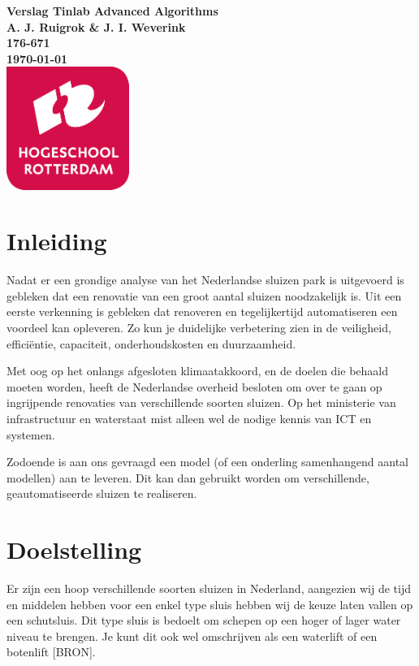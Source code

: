 \documentclass{article}
\begin{document}
\graphicspath{{../Images/}}
\sffamily
\begin{titlepage}
  \centering
    \vfill
    {\bfseries\Huge
      Verslag Tinlab Advanced Algorithms \\
        \vskip2cm
      }
      {\bfseries\Large
        A. J. Ruigrok \& J. I. Weverink\\
      }
      {
        \bfseries\normalsize
        176-671\\
        \vskip1cm
        \today\\
    }
    \vfill
    \includegraphics[width=4cm]{logohr.png} %
    \vfill
    \vfill
\end{titlepage}
\newpage
\tableofcontents

\clearpage %
\section{Inleiding}
Nadat er een grondige analyse van het Nederlandse sluizen park is uitgevoerd is gebleken dat een renovatie van een groot aantal sluizen noodzakelijk is. Uit een eerste verkenning is gebleken dat renoveren en tegelijkertijd automatiseren een voordeel kan opleveren. Zo kun je duidelijke verbetering zien in de veiligheid, efficiëntie, capaciteit, onderhoudskosten en duurzaamheid.

Met oog op het onlangs afgesloten klimaatakkoord, en de doelen die behaald moeten worden, heeft de Nederlandse overheid besloten om over te gaan op ingrijpende renovaties van verschillende soorten sluizen. Op het ministerie van infrastructuur en waterstaat mist alleen wel de nodige kennis van ICT en systemen.

Zodoende is aan ons gevraagd een model (of een onderling samenhangend aantal modellen) aan te leveren. Dit kan dan gebruikt worden om verschillende, geautomatiseerde sluizen te realiseren.


\clearpage %
\section{Doelstelling}
Er zijn een hoop verschillende soorten sluizen in Nederland, aangezien wij de tijd en middelen hebben voor een enkel type sluis hebben wij de keuze laten vallen op een schutsluis. Dit type sluis is bedoelt om schepen op een hoger of lager water niveau te brengen. Je kunt dit ook wel omschrijven als een waterlift of een botenlift [BRON].
\end{document}
